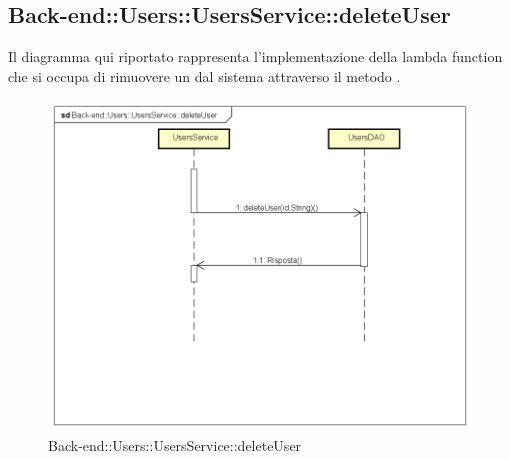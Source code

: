 \subsection{Back-end::Users::UsersService::deleteUser}
Il diagramma qui riportato rappresenta l'implementazione della lambda function che si occupa di rimuovere un  dal sistema attraverso il metodo .
\begin{figure}[h] \centering \includegraphics[width=\textwidth,height=\textheight,keepaspectratio]{images/diagrams/back-end/Ufficial_Backend/Back-endUsersUsersServicedeleteUser.png} 	\caption{Back-end::Users::UsersService::deleteUser}
\end{figure}
\newpage

